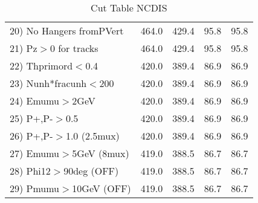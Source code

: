 \begin{table}[h!]
\begin{tabular}{||l||r|r|r|r||}
 20) No Hangers fromPVert &       464.0 &       429.4 &        95.8 &        95.8 \\
 21) Pz$>$0 for tracks    &       464.0 &       429.4 &        95.8 &        95.8 \\
 22) Thprimord$<$0.4      &       420.0 &       389.4 &        86.9 &        86.9 \\
 23) Nunh*fracunh$<$200   &       420.0 &       389.4 &        86.9 &        86.9 \\
 24) Emumu$>$2GeV         &       420.0 &       389.4 &        86.9 &        86.9 \\
 25) P+,P-$>$0.5          &       420.0 &       389.4 &        86.9 &        86.9 \\
 26) P+,P-$>$1.0 (2.5mux) &       420.0 &       389.4 &        86.9 &        86.9 \\
 27) Emumu$>$5GeV  (8mux) &       419.0 &       388.5 &        86.7 &        86.7 \\
 28) Phi12$>$90deg  (OFF) &       419.0 &       388.5 &        86.7 &        86.7 \\
 29) Pmumu$>$10GeV  (OFF) &       419.0 &       388.5 &        86.7 &        86.7 \\
 \hline
 \hline
 \end{tabular}
 \caption{Cut Table  NCDIS  }
 \label{tab-cut_ncdis}
 \end{table}
